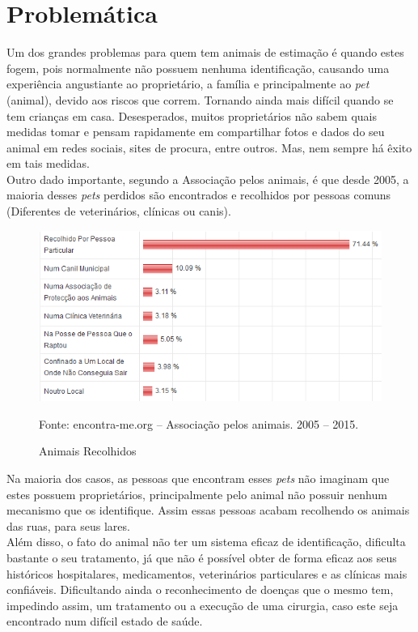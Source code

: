 \section{Problemática}

Um dos grandes problemas para quem tem animais de estimação é quando estes fogem, pois normalmente não possuem nenhuma identificação, causando uma experiência angustiante ao proprietário, a família e principalmente ao {\it pet} (animal), devido aos riscos que correm. Tornando ainda mais difícil quando se tem crianças em casa. Desesperados, muitos proprietários não sabem quais medidas tomar e pensam rapidamente em compartilhar fotos e dados do seu animal em redes sociais, sites de procura, entre outros. Mas, nem sempre há êxito em tais medidas.
\\
\indent
Outro dado importante, segundo a Associação pelos animais, é que desde 2005, a maioria desses {\it pets} perdidos são encontrados e recolhidos por pessoas comuns (Diferentes de veterinários, clínicas ou canis).


\begin{figure}[!htb]
	\centering
	\includegraphics[scale=0.70
	]{imagens/animais}
	\caption{Animais Recolhidos}
	Fonte: encontra-me.org – Associação pelos animais. 2005 – 2015.
	\label{Rotulo}
\end{figure}
\newpage
Na maioria dos casos, as pessoas que encontram esses {\it pets} não imaginam que estes possuem proprietários, principalmente pelo animal não possuir nenhum mecanismo que os identifique. Assim essas pessoas acabam recolhendo os animais das ruas, para seus lares. 
\\
\indent
Além disso, o fato do animal não ter um sistema eficaz de identificação, dificulta bastante o seu tratamento, já que não é possível obter de forma eficaz aos seus históricos hospitalares, medicamentos, veterinários particulares e as clínicas mais confiáveis. Dificultando ainda o reconhecimento de doenças que o mesmo tem, impedindo assim, um tratamento ou a execução de uma cirurgia, caso este seja encontrado num difícil estado de saúde.  


